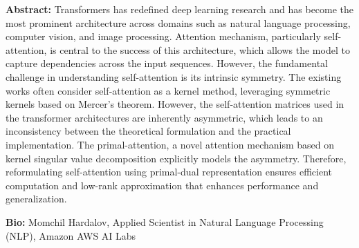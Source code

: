 \documentclass[11pt,oneside]{book}
\begin{document}
  \vspace*{0.2cm}
    \textbf{Abstract:} Transformers has redefined deep learning research and has become the most prominent architecture across domains such as natural language processing, computer vision, and image processing. Attention mechanism, particularly self-attention, is central to the success of this architecture, which allows the model to capture dependencies across the input sequences. However, the fundamental challenge in understanding self-attention is its intrinsic symmetry. The existing works often consider self-attention as a kernel method, leveraging symmetric kernels based on Mercer's theorem. However, the self-attention matrices used in the transformer architectures are inherently asymmetric, which leads to an inconsistency between the theoretical formulation and the practical implementation. The primal-attention, a novel attention mechanism based on kernel singular value decomposition explicitly models the asymmetry. Therefore, reformulating self-attention using primal-dual representation ensures efficient computation and low-rank approximation that enhances performance and generalization. 
\\
  \newline
  
    \textbf{Bio:} Momchil Hardalov, Applied Scientist in Natural Language Processing (NLP), Amazon AWS AI Labs
  \newpage
  


\end{document}
